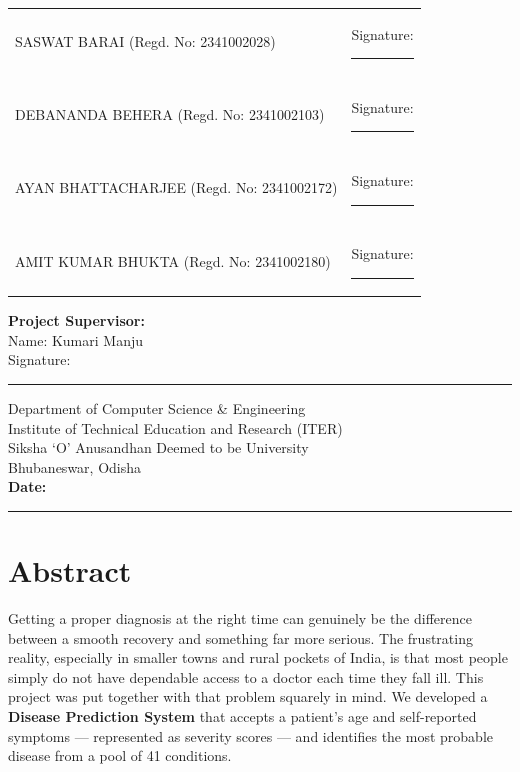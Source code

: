 \documentclass[12pt,a4paper]{article}
\begin{document}
\vspace{0.5cm}

\begin{tabular}{p{6cm} p{6cm}}
SASWAT BARAI (Regd. No: 2341002028) & Signature: \rule{5cm}{0.4pt} \\
\\
DEBANANDA BEHERA (Regd. No: 2341002103) & Signature: \rule{5cm}{0.4pt} \\
\\
AYAN BHATTACHARJEE (Regd. No: 2341002172) & Signature: \rule{5cm}{0.4pt} \\
\\
AMIT KUMAR BHUKTA (Regd. No: 2341002180) & Signature: \rule{5cm}{0.4pt} \\
\end{tabular}

\vspace{1.5cm}

\noindent
\textbf{Project Supervisor:} \\
\vspace{0.5cm}
Name: Kumari Manju \\
\vspace{0.3cm}
Signature: \rule{6cm}{0.4pt}

\vfill

\begin{center}
Department of Computer Science \& Engineering\\
Institute of Technical Education and Research (ITER)\\
Siksha `O' Anusandhan Deemed to be University\\
Bhubaneswar, Odisha\\[0.5cm]

\textbf{Date:} \rule{4cm}{0.4pt}
\end{center}

\newpage

\tableofcontents
\newpage

\section{Abstract}

Getting a proper diagnosis at the right time can genuinely be the difference between a smooth recovery and something far more serious. The frustrating reality, especially in smaller towns and rural pockets of India, is that most people simply do not have dependable access to a doctor each time they fall ill. This project was put together with that problem squarely in mind. We developed a \textbf{Disease Prediction System} that accepts a patient's age and self-reported symptoms --- represented as severity scores --- and identifies the most probable disease from a pool of 41 conditions.
\end{document}

